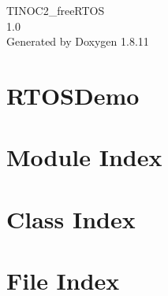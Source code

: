 \documentclass[twoside]{book}
\newcommand{\+}{\discretionary{\mbox{\scriptsize$\hookleftarrow$}}{}{}}
\newcommand{\clearemptydoublepage}{%
  \newpage{\pagestyle{empty}\cleardoublepage}%
}
\begin{document}
\hypersetup{pageanchor=false,
             bookmarksnumbered=true,
             pdfencoding=unicode
            }
\begin{titlepage}
\vspace*{7cm}
\begin{center}%
{\Large T\+I\+N\+O\+C2\+\_\+free\+R\+T\+OS \\[1ex]\large 1.\+0 }\\
\vspace*{1cm}
{\large Generated by Doxygen 1.8.11}\\
\end{center}
\end{titlepage}
\clearemptydoublepage
\tableofcontents
\clearemptydoublepage
{}
\hypersetup{pageanchor=true}

\chapter{R\+T\+O\+S\+Demo}
\label{index}\hypertarget{index}{}
\chapter{Module Index}

\chapter{Class Index}

\chapter{File Index}

\end{document}
